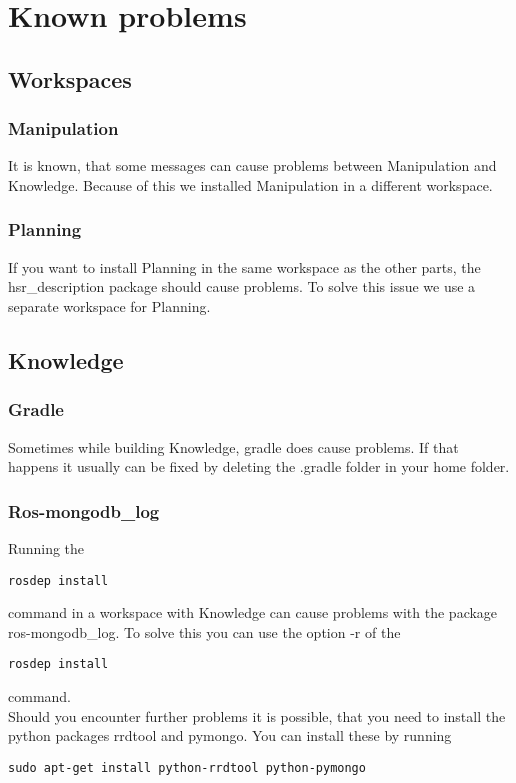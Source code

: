 \documentclass[main.tex]{subfiles}
\begin{document}
	\section{Known problems}

	\subsection{Workspaces}
	\subsubsection{Manipulation}
	It is known, that some messages can cause problems between Manipulation and Knowledge. Because of this we installed Manipulation in a different workspace.
	
	\subsubsection{Planning}
	If you want to install Planning in the same workspace as the other parts, the hsr\_description package should cause problems. To solve this issue we use a separate workspace for Planning.
	

	\subsection{Knowledge}
	\subsubsection{Gradle}
	Sometimes while building Knowledge, gradle does cause problems.
	If that happens it usually can be fixed by deleting the .gradle folder in your home folder.
	
	\subsubsection{Ros-mongodb\_log}
	Running the 
	\begin{lstlisting}
rosdep install
\end{lstlisting}
command in a workspace with Knowledge can cause problems with the package ros-mongodb\_log. To solve this you can use the option -r of the 
\begin{lstlisting}
rosdep install
\end{lstlisting}
command.\\
Should you encounter further problems it is possible, that you need to install the  python packages rrdtool and pymongo. You can install these by running
\begin{lstlisting}
sudo apt-get install python-rrdtool python-pymongo
\end{lstlisting}
\end{document}
